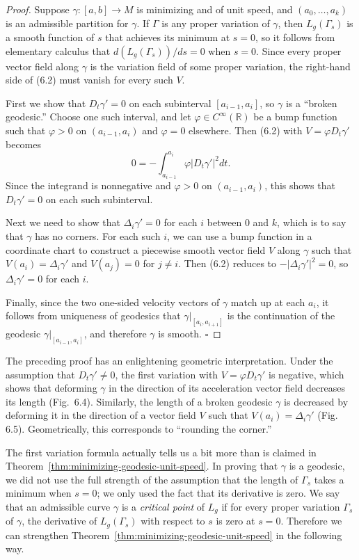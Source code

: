 \begin{proof}
Suppose $\gamma : [a, b] \to M$ is minimizing and of unit speed, and $(a_0, \ldots, a_k)$ is an admissible partition for $\gamma$. If $\Gamma$ is any proper variation of $\gamma$, then $L_g(\Gamma_s)$ is a smooth function of $s$ that achieves its minimum at $s = 0$, so it follows from elementary calculus that $d(L_g(\Gamma_s))/ds = 0$ when $s = 0$. Since every proper vector field along $\gamma$ is the variation field of some proper variation, the right-hand side of (6.2) must vanish for every such $V$.

First we show that $D_t \gamma' = 0$ on each subinterval $[a_{i-1}, a_i]$, so $\gamma$ is a ``broken geodesic.'' Choose one such interval, and let $\varphi \in C^\infty(\mathbb{R})$ be a bump function such that $\varphi > 0$ on $(a_{i-1}, a_i)$ and $\varphi = 0$ elsewhere. Then (6.2) with $V = \varphi D_t \gamma'$ becomes
\[
0 = -\int_{a_{i-1}}^{a_i} \varphi \left| D_t \gamma' \right|^2 dt.
\]
Since the integrand is nonnegative and $\varphi > 0$ on $(a_{i-1}, a_i)$, this shows that $D_t \gamma' = 0$ on each such subinterval.

Next we need to show that $\Delta_i \gamma' = 0$ for each $i$ between $0$ and $k$, which is to say that $\gamma$ has no corners. For each such $i$, we can use a bump function in a coordinate chart to construct a piecewise smooth vector field $V$ along $\gamma$ such that $V(a_i) = \Delta_i \gamma'$ and $V(a_j) = 0$ for $j \ne i$. Then (6.2) reduces to $-|\Delta_i \gamma'|^2 = 0$, so $\Delta_i \gamma' = 0$ for each $i$.

Finally, since the two one-sided velocity vectors of $\gamma$ match up at each $a_i$, it follows from uniqueness of geodesics that $\gamma|_{[a_i, a_{i+1}]}$ is the continuation of the geodesic $\gamma|_{[a_{i-1}, a_i]}$, and therefore $\gamma$ is smooth. $\square$
\end{proof}

The preceding proof has an enlightening geometric interpretation. Under the assumption that $D_t \gamma' \ne 0$, the first variation with $V = \varphi D_t \gamma'$ is negative, which shows that deforming $\gamma$ in the direction of its acceleration vector field decreases its length (Fig.\ 6.4). Similarly, the length of a broken geodesic $\gamma$ is decreased by deforming it in the direction of a vector field $V$ such that $V(a_i) = \Delta_i \gamma'$ (Fig. 6.5). Geometrically, this corresponds to ``rounding the corner.''

The first variation formula actually tells us a bit more than is claimed in Theorem~\ref{thm:minimizing-geodesic-unit-speed}. In proving that $\gamma$ is a geodesic, we did not use the full strength of the assumption that the length of $\Gamma_s$ takes a minimum when $s = 0$; we only used the fact that its derivative is zero. We say that an admissible curve $\gamma$ is a \emph{critical point} of $L_g$ if for every proper variation $\Gamma_s$ of $\gamma$, the derivative of $L_g(\Gamma_s)$ with respect to $s$ is zero at $s = 0$. Therefore we can strengthen Theorem~\ref{thm:minimizing-geodesic-unit-speed} in the following way.

